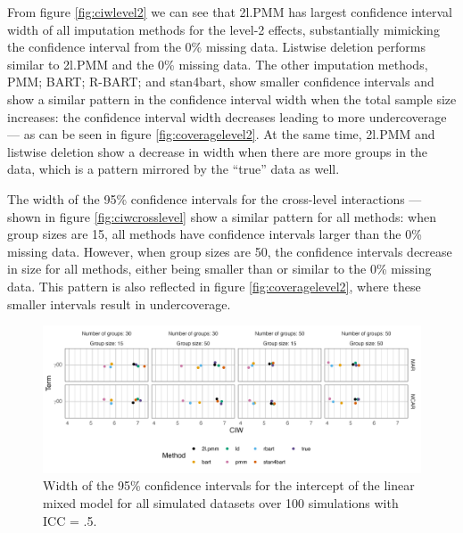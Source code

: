 \documentclass[3p,12pt,a4paper]{elsarticle}
\begin{document}

From figure \ref{fig:ciwlevel2} we can see that 2l.PMM has largest confidence interval width of all imputation methods for the level-2 effects, substantially mimicking the confidence interval from the 0\% missing data. Listwise deletion performs similar to 2l.PMM and the 0\% missing data. The other imputation methods, PMM; BART; R-BART; and stan4bart, show smaller confidence intervals and show a similar pattern in the confidence interval width when the total sample size increases: the confidence interval width decreases leading to more undercoverage --- as can be seen in figure \ref{fig:coveragelevel2}. At the same time, 2l.PMM and listwise deletion show a decrease in width when there are more groups in the data, which is a pattern mirrored by the ``true'' data as well. 


The width of the 95\% confidence intervals for the cross-level interactions --- shown in figure \ref{fig:ciwcrosslevel} show a similar pattern for all methods: when group sizes are 15, all methods have confidence intervals larger than the 0\% missing data. However, when group sizes are 50, the confidence intervals decrease in size for all methods, either being smaller than or similar to the 0\% missing data. This pattern is also reflected in figure \ref{fig:coveragelevel2}, where these smaller intervals result in undercoverage.

\begin{figure}[H]
    \centering
    \includegraphics[width=1\textwidth]{ciwintercept.png}
    \caption{Width of the 95\% confidence intervals for the intercept of the linear mixed model for all simulated datasets over 100 simulations with ICC = .5.}
    \label{fig:ciwintercept}
\end{figure}
\end{document}
